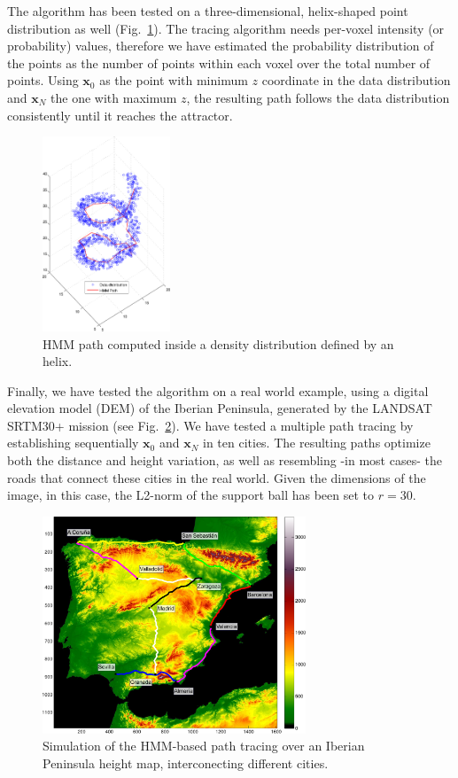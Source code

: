 The algorithm has been tested on a three-dimensional, helix-shaped point distribution as well (Fig.~\ref{fig:spire}). The tracing algorithm needs per-voxel intensity (or probability) values, therefore we have estimated the probability distribution of the points as the number of points within each voxel over the total number of points. Using $\mathbf{x}_0$ as the point with minimum $z$ coordinate in the data distribution and $\mathbf{x}_N$ the one with maximum $z$, the resulting path follows the data distribution consistently until it reaches the attractor. 
\begin{figure}
	\begin{center}
		\includegraphics[width=1.5in]{gfx/ch6/spire}
		\caption{\ac{HMM} path computed inside a density distribution defined by an helix.}
		\label{fig:spire}
	\end{center}
\end{figure}

Finally, we have tested the algorithm on a real world example, using a digital elevation model (DEM) of the Iberian Peninsula, generated by the LANDSAT SRTM30+ mission (see Fig.~\ref{fig:spainmap}). We have tested a multiple path tracing by establishing sequentially $\mathbf{x}_0$ and $\mathbf{x}_N$ in ten cities. The resulting paths optimize both the distance and height variation, as well as resembling -in most cases- the roads that connect these cities in the real world. Given the dimensions of the image, in this case, the L2-norm of the support ball has been set to $r=30$. 

\begin{figure}[htp]
	\centering
	\includegraphics[width=0.7\textwidth]{gfx/ch6/spain.pdf}
	\caption{Simulation of the \ac{HMM}-based path tracing over an Iberian Peninsula height map, interconecting different cities.}
	\label{fig:spainmap}
\end{figure}



